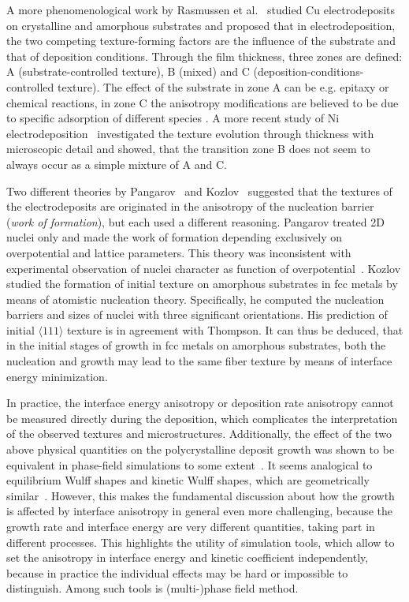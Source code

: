 A more phenomenological work by Rasmussen et al.~\cite{Rasmussen2001} studied Cu electrodeposits on crystalline and amorphous substrates and proposed that in electrodeposition, the two competing texture-forming factors are the influence of the substrate and that of deposition conditions. Through the film thickness, three zones are defined: A (substrate-controlled texture), B (mixed) and C (deposition-conditions-controlled texture). The effect of the substrate in zone A can be e.g. epitaxy or chemical reactions, in zone C the anisotropy modifications are believed to be due to specific adsorption of different species \cite{Amblard1979,BergenstofNielsen1997}. A more recent study of Ni electrodeposition~\cite{Alimadadi2016} investigated the texture evolution through thickness with microscopic detail and showed, that the transition zone B does not seem to always occur as a simple mixture of A and C.

Two different theories by Pangarov~\cite{Pangarov1962,Pangarov1964} and Kozlov~\cite{Kozlov2003} suggested that the textures of the electrodeposits are originated in the anisotropy of the nucleation barrier (\textit{work of formation}), but each used a different reasoning. Pangarov treated 2D nuclei only and made the work of formation depending exclusively on overpotential and lattice parameters. This theory was inconsistent with experimental observation of nuclei character as function of overpotential~\cite{Bulatov2014}. Kozlov studied the formation of initial texture on amorphous substrates in fcc metals by means of atomistic nucleation theory. Specifically, he computed the nucleation barriers and sizes of nuclei with three significant orientations. His prediction of initial $\langle111\rangle$ texture is in agreement with Thompson. It can thus be deduced, that in the initial stages of growth in fcc metals on amorphous substrates, both the nucleation and growth may lead to the same fiber texture by means of interface energy minimization. 

In practice, the interface energy anisotropy or deposition rate anisotropy cannot be measured directly during the deposition, which complicates the interpretation of the observed textures and microstructures. Additionally, the effect of the two above physical quantities on the polycrystalline deposit growth was shown to be equivalent in phase-field simulations to some extent~\cite{Wendler2011}. It seems analogical to equilibrium Wulff shapes and kinetic Wulff shapes, which are geometrically similar~\cite{Kobayashi2001}. However, this makes the fundamental discussion about how the growth is affected by interface anisotropy in general even more challenging, because the growth rate and interface energy are very different quantities, taking part in different processes. This highlights the utility of simulation tools, which allow to set the anisotropy in interface energy and kinetic coefficient independently, because in practice the individual effects may be hard or impossible to distinguish. Among such tools is (multi-)phase field method.

